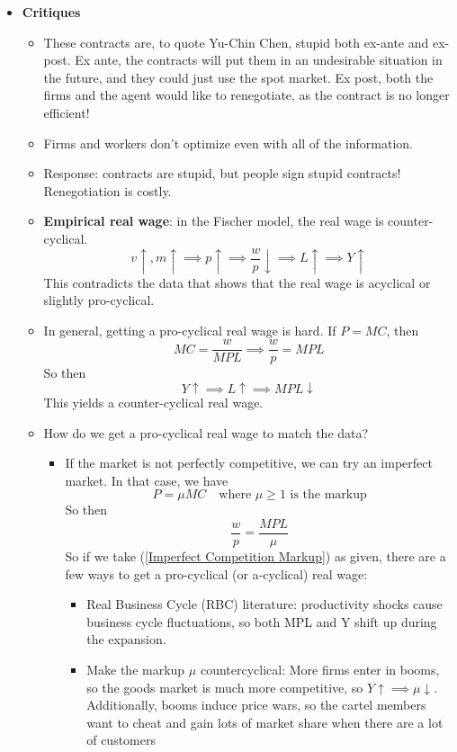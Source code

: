 \documentclass[12pt]{article}
\begin{document}
\begin{itemize}
    \item \textbf{Critiques}
    \begin{itemize}
        \item These contracts are, to quote Yu-Chin Chen, stupid both ex-ante and ex-post. Ex ante, the contracts will put them in an undesirable situation in the future, and they could just use the spot market. Ex post, both the firms and the agent would like to renegotiate, as the contract is no longer efficient!
        \item Firms and workers don't optimize even with all of the information.
        \item Response: contracts are stupid, but people sign stupid contracts! Renegotiation is costly. 
        \item \textbf{Empirical real wage}: in the Fischer model, the real wage is counter-cyclical. 
        \[v \uparrow, m \uparrow \implies p \uparrow \implies \frac{w}{p} \downarrow \implies L \uparrow \implies Y \uparrow \]
        This contradicts the data that shows that the real wage is acyclical or slightly pro-cyclical. 
        \item In general, getting a pro-cyclical real wage is hard. If $P=MC$, then 
        \[MC = \frac{w}{MPL} \implies \frac{w}{p} = MPL\]
        So then 
        \[Y \uparrow \implies L\uparrow \implies MPL \downarrow\]
        This yields a counter-cyclical real wage.
        \item How do we get a pro-cyclical real wage to match the data?
        \begin{itemize}
            \item If the market is not perfectly competitive, we can try an imperfect market. In that case, we have
            \[P = \mu MC \quad \text{where $\mu \geq 1$ is the markup}\]
            So then
            \begin{equation}\label{Imperfect Competition Markup}
                \frac{w}{p} = \frac{MPL}{\mu}
            \end{equation}
            So if we take (\ref{Imperfect Competition Markup}) as given, there are a few ways to get a pro-cyclical (or a-cyclical) real wage:
            \begin{itemize}
                \item Real Business Cycle (RBC) literature: productivity shocks cause business cycle fluctuations, so both MPL and Y shift up during the expansion.
                \item Make the markup $\mu$ countercyclical:  More firms enter in booms, so the goods market is much more competitive, so $Y \uparrow \implies \mu \downarrow$. Additionally, booms induce price wars, so the cartel members want to cheat and gain lots of market share when there are a lot of customers

\end{itemize}
\end{itemize}
\end{itemize}
\end{itemize}
\end{document}
